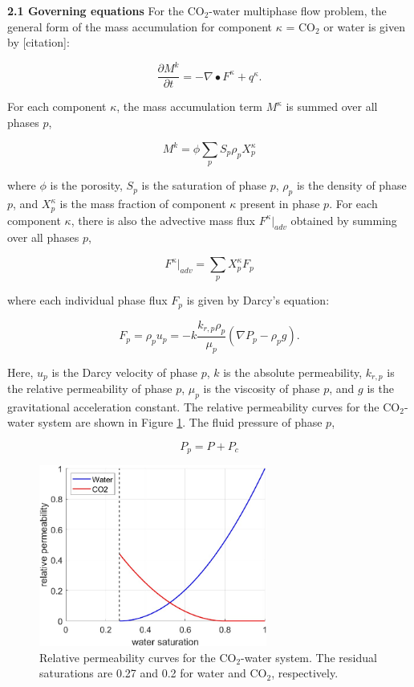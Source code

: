 \documentclass[10pt, twoside]{article}
\begin{document}
\textbf{2.1 Governing equations} 
For the CO$_2$-water multiphase flow problem, the general form of the mass accumulation for component $\kappa$ = CO$_2$ or water is given by [citation]:

\begin{equation} \label{eq1}
    \frac{\partial M^k}{\partial t} = -\nabla \bullet F^\kappa + q^\kappa .
\end{equation}

For each component $\kappa$, the mass accumulation term $M^\kappa$ is summed over all phases $p$,

\begin{equation} \label{eq2}
    M^k = \phi \sum_p S_p \rho_p X_p^\kappa
\end{equation}

where $\phi$ is the porosity, $S_p$ is the saturation of phase $p$, $\rho_p$ is the density of phase $p$, and $X_p^\kappa$ is the mass fraction of component $\kappa$ present in phase $p$. For each component $\kappa$, there is also the advective mass flux $F^\kappa \rvert_{adv}$ obtained by summing over all phases $p$, 

\begin{equation} \label{eq3}
    F^\kappa \rvert_{adv} = \sum_p X_p^\kappa F_p
\end{equation}

where each individual phase flux $F_p$ is given by Darcy's equation:

\begin{equation} \label{eq4}
    F_p = \rho_p u_p = -k \frac{k_{r,p} \rho_p}{\mu_p} (\nabla P_p - \rho_p g).
\end{equation}

Here, $u_p$ is the Darcy velocity of phase $p$, $k$ is the absolute permeability, $k_{r,p}$ is the relative permeability of phase $p$, $\mu_p$ is the viscosity of phase $p$, and $g$ is the gravitational acceleration constant. The relative permeability curves for the CO$_2$-water system are shown in Figure \ref{relperms}. The fluid pressure of phase $p$,

\begin{equation} \label{eq5}
    P_p = P + P_c
\end{equation}

\begin{figure}
    \centering
    \includegraphics[width=7.5cm]{figures/relperms.jpg}
    \caption{Relative permeability curves for the CO$_2$-water system. The residual saturations are 0.27 and 0.2 for water and CO$_2$, respectively.}
    \label{relperms}
\end{figure}
\end{document}
